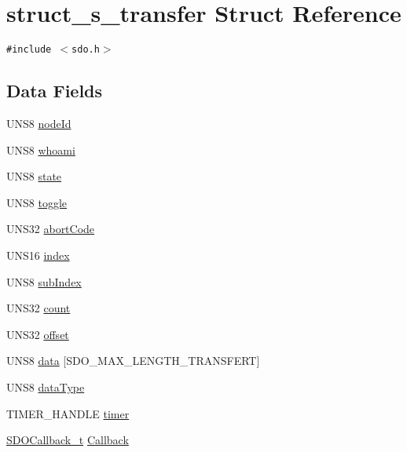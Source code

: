 \hypertarget{structstruct__s__transfer}{
\section{struct\_\-s\_\-transfer Struct Reference}
\label{structstruct__s__transfer}
}
{\tt \#include $<$sdo.h$>$}

\subsection*{Data Fields}
\begin{CompactItemize}
\item 
UNS8 \hyperlink{structstruct__s__transfer_2b0484e16a202ee1bfd43e16b0bae16f}{node\-Id}
\item 
UNS8 \hyperlink{structstruct__s__transfer_aa0efe13c25c38cc79842b3eded01b96}{whoami}
\item 
UNS8 \hyperlink{structstruct__s__transfer_41d265854e5ebb062db224276888ab21}{state}
\item 
UNS8 \hyperlink{structstruct__s__transfer_8b43e3d56cae7eb574d239f85b6aebb2}{toggle}
\item 
UNS32 \hyperlink{structstruct__s__transfer_214694408d5f6e87695807efd2cfbc47}{abort\-Code}
\item 
UNS16 \hyperlink{structstruct__s__transfer_36eca18553634876a27fc4b89578e3bc}{index}
\item 
UNS8 \hyperlink{structstruct__s__transfer_fca5916593f97eb6d006fe11c7b28983}{sub\-Index}
\item 
UNS32 \hyperlink{structstruct__s__transfer_42a6d8e63916bf2b2d1649995f8f0e11}{count}
\item 
UNS32 \hyperlink{structstruct__s__transfer_f29303b809a05773a5333fb079c59ff7}{offset}
\item 
UNS8 \hyperlink{structstruct__s__transfer_b907a54e35126b8e267f546699e1df25}{data} \mbox{[}SDO\_\-MAX\_\-LENGTH\_\-TRANSFERT\mbox{]}
\item 
UNS8 \hyperlink{structstruct__s__transfer_bac6b366cfcddb5e7d64f6bf2eb97d74}{data\-Type}
\item 
TIMER\_\-HANDLE \hyperlink{structstruct__s__transfer_5ef26fb9ec5de7702471923586933a1a}{timer}
\item 
\hyperlink{sdo_8h_606eccfef67e572723e1efba3f0d87ba}{SDOCallback\_\-t} \hyperlink{structstruct__s__transfer_e32787d562569a71aa8f9633e3d34ca0}{Callback}
\end{CompactItemize}



